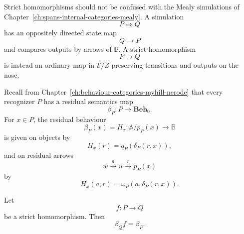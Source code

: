 \begin{remark}
\label{rem:strict-homomorphisms-versus-simulations}
    Strict homomorphisms should not be confused with the Mealy simulations of
    Chapter~\ref{ch:spans-internal-categories-mealy}. A simulation
    \[
        P\Rightarrow Q
    \]
    has an oppositely directed state map
    \[
        Q\to P
    \]
    and compares outputs by arrows of \(\mathbb B\). A strict homomorphism
    \[
        P\to Q
    \]
    is instead an ordinary map in \(\mathcal E/Z\) preserving transitions and
    outputs on the nose.
\end{remark}

Recall from Chapter~\ref{ch:behaviour-categories-myhill-nerode} that every
recognizer \(P\) has a residual semantics map
\[
    \beta_P:P\to\mathbf{Beh}_0.
\]
For \(x\in P\), the residual behaviour
\[
    \beta_P(x)=H_x:\mathbb A/p_P(x)\to\mathbb B
\]
is given on objects by
\[
    H_x(r)=q_P(\delta_P(r,x)),
\]
and on residual arrows
\[
    w\xrightarrow{a}u\xrightarrow{r}p_P(x)
\]
by
\[
    H_x(a,r)=\omega_P(a,\delta_P(r,x)).
\]

\begin{lemma}
\label{lem:strict-homs-preserve-beta}
    Let
    \[
        f:P\to Q
    \]
    be a strict homomorphism. Then
    \[
        \beta_Qf=\beta_P.
    \]
\end{lemma}

